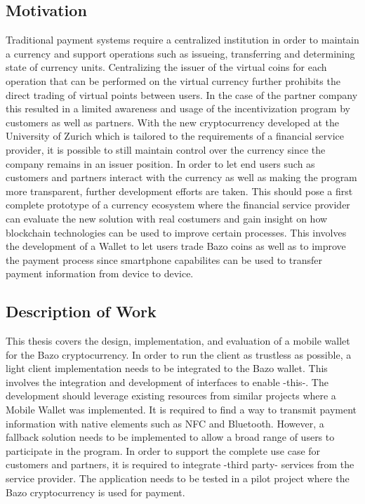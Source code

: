 \documentclass[a4paper]{article}
\begin{document}
\subsection{Motivation}
Traditional payment systems require a centralized institution in order to maintain a currency and support operations such as issueing, transferring and determining state of currency units. Centralizing the issuer of the virtual coins for each operation that can be performed on the virtual currency further prohibits the direct trading of virtual points between users.
In the case of the partner company this resulted in a limited awareness and usage of the incentivization program by customers as well as partners.
With the new cryptocurrency developed at the University of Zurich which is tailored to the requirements of a financial service provider, it is possible to still maintain control over the currency since the company remains in an issuer position. In order to let end users such as customers and partners interact with the currency as well as making the program more transparent, further development efforts are taken. This should pose a first complete prototype of a currency ecosystem where the financial service provider can evaluate the new solution with real costumers and gain insight on how blockchain technologies can be used to improve certain processes. This involves the development of a Wallet to let users trade Bazo coins as well as to improve the payment process since smartphone capabilites can be used to transfer payment information from device to device.

\subsection{Description of Work}
This thesis covers the design, implementation, and evaluation of a mobile wallet for the Bazo cryptocurrency. In order to run the client as trustless as possible, a light client implementation needs to be integrated to the Bazo wallet. This involves the integration and development of interfaces to enable -this-.
The development should leverage existing resources from similar projects where a Mobile Wallet was implemented.
It is required to find a way to transmit payment information with native elements such as NFC and Bluetooth. However, a fallback solution needs to be implemented to allow a broad range of users to participate in the program.
In order to support the complete use case for customers and partners, it is required to integrate -third party- services from the service provider.
The application needs to be tested in a pilot project where the Bazo cryptocurrency is used for payment.
\end{document}
